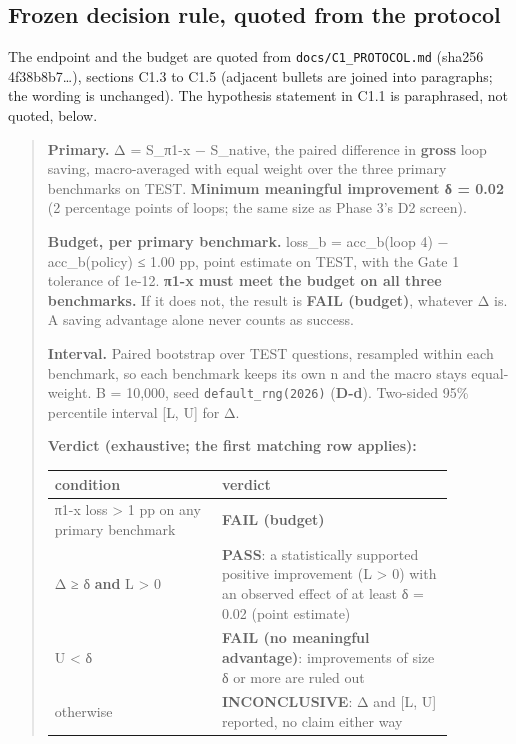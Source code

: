 \subsection{Frozen decision rule, quoted from the protocol}

The endpoint and the budget are quoted from \texttt{docs/C1\_PROTOCOL.md} (sha256 4f38b8b7\ldots), sections C1.3 to C1.5 (adjacent bullets are joined into paragraphs; the wording is unchanged). The hypothesis statement in C1.1 is paraphrased, not quoted, below.

\begin{quote}
\textbf{Primary.} Δ = S\_π1-x − S\_native, the paired difference in \textbf{gross} loop saving, macro-averaged with equal weight over the three primary benchmarks on TEST. \textbf{Minimum meaningful improvement δ = 0.02} (2 percentage points of loops; the same size as Phase 3's D2 screen).

\textbf{Budget, per primary benchmark.} loss\_b = acc\_b(loop 4) − acc\_b(policy) ≤ 1.00 pp, point estimate on TEST, with the Gate 1 tolerance of 1e-12. \textbf{π1-x must meet the budget on all three benchmarks.} If it does not, the result is \textbf{FAIL (budget)}, whatever Δ is. A saving advantage alone never counts as success.

\textbf{Interval.} Paired bootstrap over TEST questions, resampled within each benchmark, so each benchmark keeps its own n and the macro stays equal-weight. B = 10,000, seed \texttt{default\_rng(2026)} (\textbf{D-d}). Two-sided 95\% percentile interval {[}L, U{]} for Δ.

\textbf{Verdict (exhaustive; the first matching row applies):}

\begin{center}\small
\begin{tabular}{@{}p{0.36\linewidth}p{0.5\linewidth}@{}}
\toprule
condition & verdict \\
\midrule
π1-x loss \textgreater{} 1 pp on any primary benchmark & \textbf{FAIL (budget)} \\
Δ ≥ δ \textbf{and} L \textgreater{} 0 & \textbf{PASS}: a statistically supported positive improvement (L \textgreater{} 0) with an observed effect of at least δ = 0.02 (point estimate) \\
U \textless{} δ & \textbf{FAIL (no meaningful advantage)}: improvements of size δ or more are ruled out \\
otherwise & \textbf{INCONCLUSIVE}: Δ and {[}L, U{]} reported, no claim either way \\
\bottomrule
\end{tabular}
\end{center}
\end{quote}

